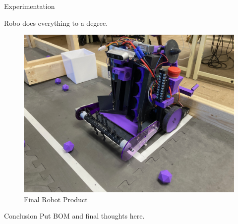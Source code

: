 \documentclass[final]{beamer}
\newlength{\colwidth}
\begin{document}
\begin{frame}[t]
\begin{columns}[t]
\begin{column}{\colwidth}
    \begin{block}{Experimentation}

    Robo does everything to a degree.

  \end{block}

  \begin{figure}
      \centering
      \includegraphics[width=20.0cm]{Robot_Practice_Field.jpg}
      \caption{Final Robot Product}
    \end{figure}

  \begin{block}{Conclusion}
    Put BOM and final thoughts here.





\end{block}
\end{column}
\end{columns}
\end{frame}
\end{document}
